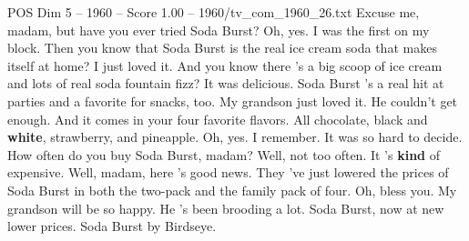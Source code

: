 \begin{textsample}{POS Dim 5 – 1960 – Score 1.00 – 1960/tv\_com\_1960\_26.txt}  \label{ex:f5_pos_090}
Excuse me, madam, but have you ever tried Soda Burst?
Oh, yes.
I was the first on my block.
Then you know that Soda Burst is the real ice cream soda that makes itself at home?
I just loved it.
And you know there 's a big scoop of ice cream and lots of real soda fountain fizz?
It was delicious.
Soda Burst 's a real hit at parties and a favorite for snacks, too.
My grandson just loved it.
He couldn't get enough.
And it comes in your four favorite flavors.
All chocolate, black and \textbf{white}, strawberry, and pineapple.
Oh, yes.
I remember.
It was so hard to decide.
How often do you buy Soda Burst, madam?
Well, not too often.
It 's \textbf{kind} of expensive.
Well, madam, here 's good news.
They 've just lowered the prices of Soda Burst in both the two-pack and the family pack of four.
Oh, bless you.
My grandson will be so happy.
He 's been brooding a lot.
Soda Burst, now at new lower prices.
Soda Burst by Birdseye.

\end{textsample}
